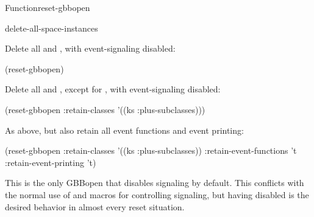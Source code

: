 \documentclass[10pt,twoside,english,pdftex]{article}
\begin{document}
\begin{functiondoc}{Function}{reset-gbbopen}
\begin{alsos}{delete-all-space-instances}
\end{alsos}

\fnexamples
Delete all  and , with
event-signaling disabled:
\begin{example}
  (reset-gbbopen)
\end{example}

Delete all  and , except for
 , with event-signaling disabled:
\begin{example}
  (reset-gbbopen :retain-classes '((ks :plus-subclasses)))
\end{example}

As above, but also retain all event functions and event printing:
\begin{example}
  (reset-gbbopen :retain-classes '((ks :plus-subclasses))
		 :retain-event-functions 't
		 :retain-event-printing 't)
\end{example}

\fnnotes 
{}%
%
This is the only GBBopen  that disables 
signaling by default.  This conflicts with the normal use of
\textbf{} and
\textbf{} macros for controlling
 signaling, but having  disabled is the desired
behavior in almost every reset situation.

\end{functiondoc}

\end{document}
